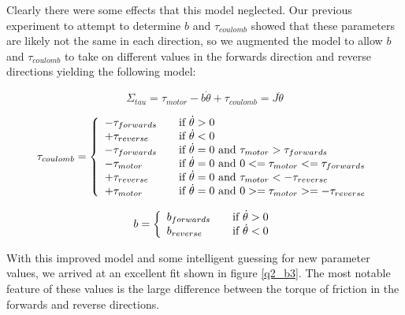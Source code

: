 \documentclass{article}
\theoremstyle{plain}
\theoremstyle{definition}
\theoremstyle{remark}
\begin{document}
Clearly there were some effects that this model neglected.  Our previous experiment to attempt to determine $b$ and $\tau_{coulomb}$ showed that these parameters are likely not the same in each direction, so we augmented the model to allow $b$ and $\tau_{coulomb}$ to take on different values in the forwards direction and reverse directions yielding the following model:

$$ \Sigma_{tau} = \tau_{motor} - b\dot{\theta} + \tau_{coulomb} = J \ddot{\theta} $$

\[
  \tau_{coulomb} = \left\{
  \begin{array}{l l}
    	- \tau_{forwards} & \quad \text{if } \dot{\theta} > 0 \\
    	+ \tau_{reverse} & \quad \text{if } \dot{\theta} < 0 \\
	- \tau_{forwards} & \quad \text{if } \dot{\theta} = 0 \text{ and } \tau_{motor} > \tau_{forwards} \\
	- \tau_{motor} & \quad \text{if } \dot{\theta} = 0 \text{ and } 0 <= \tau_{motor} <= \tau_{forwards} \\
	+ \tau_{reverse} & \quad \text{if } \dot{\theta} = 0 \text{ and } \tau_{motor} < -\tau_{reverse} \\
	+ \tau_{motor} & \quad \text{if } \dot{\theta} = 0 \text{ and } 0 >=\tau_{motor} >= -\tau_{reverse}\\
  \end{array} \right.
\]

\[
b = \left\{
\begin{array}{l l}
b_{forwards} & \quad \text{if } \dot{\theta} > 0 \\
b_{reverse} & \quad  \text{if } \dot{\theta} < 0 \\
\end{array} \right.
\]

With this improved model and some intelligent guessing for new parameter values, we arrived at an excellent fit shown in figure \ref{q2_b3}.
The most notable feature of these values is the large difference between the torque of friction in the forwards and reverse directions.  
\end{document}
